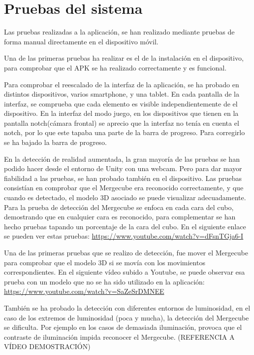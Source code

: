 \section{Pruebas del sistema}
Las pruebas realizadas a la aplicación, se han realizado mediante pruebas de forma manual directamente en el dispositivo móvil.

Una de las primeras pruebas ha realizar es el de la instalación en el dispositivo, para comprobar que el APK se ha realizado correctamente y es funcional. 

Para comprobar el reescalado de la interfaz de la aplicación, se ha probado en distintos dispositivos, varios smartphone, y una tablet. En cada pantalla de la interfaz, se comprueba que cada elemento es visible independientemente de el dispositivo.
En la interfaz del modo juego, en los dispositivos que tienen en la pantalla notch(cámara frontal) se aprecio que la interfaz no tenía en cuenta el notch, por lo que este tapaba una parte de la barra de progreso. Para corregirlo se ha bajado la barra de progreso.

En la detección de realidad aumentada, la gran mayoría de las pruebas se han podido hacer desde el entorno de Unity con una webcam. Pero para dar mayor fiabilidad a las pruebas, se han probado también en el dispositivo. Las pruebas consistían en comprobar que el Mergecube era reconocido correctamente, y que cuando es detectado, el modelo 3D asociado se puede visualizar adecuadamente. Para la prueba de detección del Mergecube se enfoca en cada cara del cubo, demostrando que en cualquier cara es reconocido, para complementar se han hecho pruebas tapando un porcentaje de la cara del cubo. En el siguiente enlace se pueden ver estas pruebas: \url{https://www.youtube.com/watch?v=dFsnTGja6-I}

Una de las primeras pruebas que se realizo de detección, fue mover el Mergecube para comprobar que el modelo 3D si se movía con los movimientos correspondientes. En el siguiente vídeo subido a Youtube, se puede observar esa prueba con un modelo que no se ha sido utilizado en la aplicación: \url{https://www.youtube.com/watch?v=SaZeSrDMNEE}

También se ha probado la detección con diferentes entornos de luminosidad, en el caso de los extremos de luminosidad (poca y mucha), la detección del Mergecube se dificulta. Por ejemplo en los casos de demasiada iluminación, provoca que el contraste de iluminación impida reconocer el Mergecube. 
(REFERENCIA A VÍDEO DEMOSTRACIÓN)

